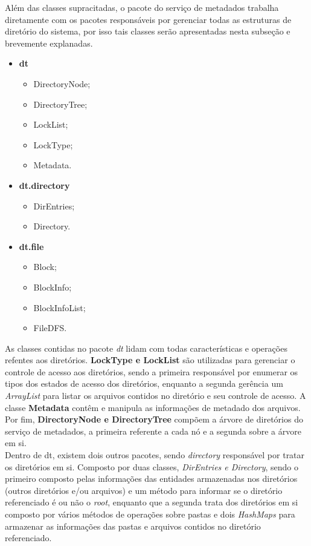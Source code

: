 Além das classes supracitadas, o pacote do serviço de metadados trabalha diretamente com os pacotes responsáveis por gerenciar todas as estruturas de diretório do sistema, por isso tais classes serão apresentadas nesta subseção e brevemente explanadas.
\\

\begin{itemize}
	\item \textbf{dt}
	\begin{itemize}
		\item DirectoryNode;
		\item DirectoryTree;
		\item LockList;
		\item LockType;
		\item Metadata.
	\end{itemize}
	\item \textbf{dt.directory}
	\begin{itemize}
		\item DirEntries;
		\item Directory.
	\end{itemize}
	\item \textbf{dt.file}
	\begin{itemize}
		\item Block;
		\item BlockInfo;
		\item BlockInfoList;
		\item FileDFS.
	\end{itemize}
\end{itemize}

As classes contidas no pacote \textit{dt} lidam com todas características e operações refentes aos diretórios. \textbf{LockType e LockList} são utilizadas para gerenciar o controle de acesso aos diretórios, sendo a primeira responsável por enumerar os tipos dos estados de acesso dos diretórios, enquanto a segunda gerência um \textit{ArrayList} para listar os arquivos contidos no diretório e seu controle de acesso. A classe \textbf{Metadata} contêm e manipula as informações de metadado dos arquivos. Por fim, \textbf{DirectoryNode e DirectoryTree} compõem a árvore de diretórios do serviço de metadados, a primeira referente a cada nó e a segunda sobre a árvore em si.
\\

Dentro de dt, existem dois outros pacotes, sendo \textit{directory} responsável por tratar os diretórios em si. Composto por duas classes, \textit{DirEntries e Directory}, sendo o primeiro composto pelas informações das entidades armazenadas nos diretórios (outros diretórios e/ou arquivos) e um método para informar se o diretório referenciado é ou não o \textit{root}, enquanto que a segunda trata dos diretórios em si composto por vários métodos de operações sobre pastas e dois \textit{HashMaps} para armazenar as informações das pastas e arquivos contidos no diretório referenciado.
\\

